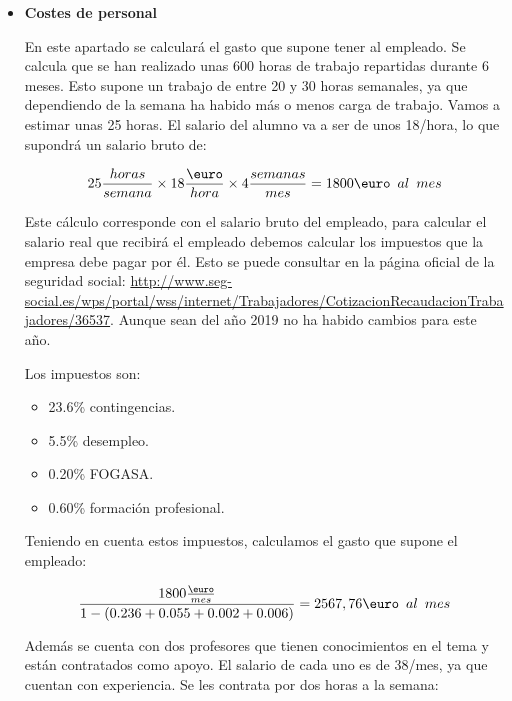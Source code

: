 \begin{itemize}
\item\textbf{Costes de personal}

En este apartado se calculará el gasto que supone tener al empleado. Se calcula que se han realizado unas 600 horas de trabajo repartidas durante 6 meses. Esto supone un trabajo de entre 20 y 30 horas semanales, ya que dependiendo de la semana ha habido más o menos carga de trabajo. Vamos a estimar unas 25 horas.
El salario del alumno va a ser de unos 18\EUR{}/hora, lo que supondrá un salario bruto de:


 $$ 25\frac{horas}{semana}\times18\frac{\text{\euro}}{hora}\times4\frac{semanas}{mes}=1800\text{\euro}\hspace{0.5em}al\hspace{0.5em}mes  $$
 
Este cálculo corresponde con el salario bruto del empleado, para calcular el salario real que recibirá el empleado debemos calcular los impuestos que la empresa debe pagar por él. Esto se puede consultar en la página oficial de la seguridad social: \url{http://www.seg-social.es/wps/portal/wss/internet/Trabajadores/CotizacionRecaudacionTrabajadores/36537}. Aunque sean del año 2019 no ha habido cambios para este año.

Los impuestos son:
\begin{itemize}
\tightlist
    \item 23.6\% contingencias.
    \item 5.5\% desempleo.
    \item 0.20\% FOGASA.
    \item 0.60\% formación profesional.
\end{itemize}


Teniendo en cuenta estos impuestos, calculamos el gasto que supone el empleado:

$$\frac{1800\frac{\text{\euro}}{mes}}{1-(0.236+0.055+0.002+0.006)}=2567,76\text{\euro}\hspace{0.5em}al\hspace{0.5em}mes$$

Además se cuenta con dos profesores que tienen conocimientos en el tema y están contratados como apoyo. El salario de cada uno es de 38\EUR{}/mes, ya que cuentan con experiencia. Se les contrata por dos horas a la semana:


\end{itemize}

